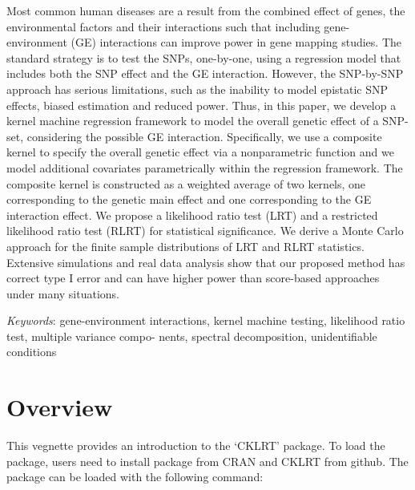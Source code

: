 \documentclass[11pt,]{article}
\renewenvironment{abstract}
 {{%
    \setlength{\leftmargin}{0mm}
    \setlength{\rightmargin}{\leftmargin}%
  }%
  \relax}
 {\endlist}
\begin{document}
\begin{abstract}

    \hbox{\vrule height .2pt width 39.14pc}

    \vskip 8.5pt %

\noindent Most common human diseases are a result from the combined effect of
genes, the environmental factors and their interactions such that
including gene-environment (GE) interactions can improve power in gene
mapping studies. The standard strategy is to test the SNPs, one-by-one,
using a regression model that includes both the SNP effect and the GE
interaction. However, the SNP-by-SNP approach has serious limitations,
such as the inability to model epistatic SNP effects, biased estimation
and reduced power. Thus, in this paper, we develop a kernel machine
regression framework to model the overall genetic effect of a SNP-set,
considering the possible GE interaction. Specifically, we use a
composite kernel to specify the overall genetic effect via a
nonparametric function and we model additional covariates parametrically
within the regression framework. The composite kernel is constructed as
a weighted average of two kernels, one corresponding to the genetic main
effect and one corresponding to the GE interaction effect. We propose a
likelihood ratio test (LRT) and a restricted likelihood ratio test
(RLRT) for statistical significance. We derive a Monte Carlo approach
for the finite sample distributions of LRT and RLRT statistics.
Extensive simulations and real data analysis show that our proposed
method has correct type I error and can have higher power than
score-based approaches under many situations.


\vskip 8.5pt \noindent \emph{Keywords}: gene-environment interactions, kernel machine testing, likelihood ratio
test, multiple variance compo- nents, spectral decomposition,
unidentifiable conditions \par

    \hbox{\vrule height .2pt width 39.14pc}



\end{abstract}


\vskip 6.5pt


\noindent  \section{Overview}\label{overview}

This vegnette provides an introduction to the `CKLRT' package. To load
the package, users need to install package from CRAN and CKLRT from
github. The package can be loaded with the following command:
\end{document}
